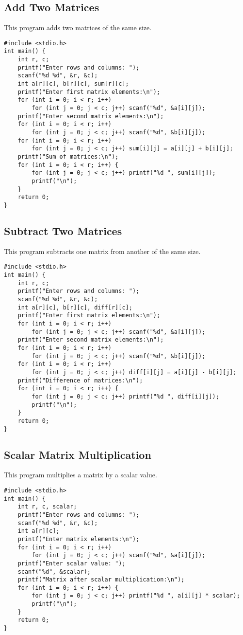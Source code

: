\documentclass[a4paper,12pt]{article}
\begin{document}
\subsection{Add Two Matrices}
This program adds two matrices of the same size.
\begin{lstlisting}[caption={Add Two Matrices}]
#include <stdio.h>
int main() {
    int r, c;
    printf("Enter rows and columns: ");
    scanf("%d %d", &r, &c);
    int a[r][c], b[r][c], sum[r][c];
    printf("Enter first matrix elements:\n");
    for (int i = 0; i < r; i++)
        for (int j = 0; j < c; j++) scanf("%d", &a[i][j]);
    printf("Enter second matrix elements:\n");
    for (int i = 0; i < r; i++)
        for (int j = 0; j < c; j++) scanf("%d", &b[i][j]);
    for (int i = 0; i < r; i++)
        for (int j = 0; j < c; j++) sum[i][j] = a[i][j] + b[i][j];
    printf("Sum of matrices:\n");
    for (int i = 0; i < r; i++) {
        for (int j = 0; j < c; j++) printf("%d ", sum[i][j]);
        printf("\n");
    }
    return 0;
}
\end{lstlisting}
\clearpage

\subsection{Subtract Two Matrices}
This program subtracts one matrix from another of the same size.
\begin{lstlisting}[caption={Subtract Two Matrices}]
#include <stdio.h>
int main() {
    int r, c;
    printf("Enter rows and columns: ");
    scanf("%d %d", &r, &c);
    int a[r][c], b[r][c], diff[r][c];
    printf("Enter first matrix elements:\n");
    for (int i = 0; i < r; i++)
        for (int j = 0; j < c; j++) scanf("%d", &a[i][j]);
    printf("Enter second matrix elements:\n");
    for (int i = 0; i < r; i++)
        for (int j = 0; j < c; j++) scanf("%d", &b[i][j]);
    for (int i = 0; i < r; i++)
        for (int j = 0; j < c; j++) diff[i][j] = a[i][j] - b[i][j];
    printf("Difference of matrices:\n");
    for (int i = 0; i < r; i++) {
        for (int j = 0; j < c; j++) printf("%d ", diff[i][j]);
        printf("\n");
    }
    return 0;
}
\end{lstlisting}
\clearpage

\subsection{Scalar Matrix Multiplication}
This program multiplies a matrix by a scalar value.
\begin{lstlisting}[caption={Scalar Matrix Multiplication}]
#include <stdio.h>
int main() {
    int r, c, scalar;
    printf("Enter rows and columns: ");
    scanf("%d %d", &r, &c);
    int a[r][c];
    printf("Enter matrix elements:\n");
    for (int i = 0; i < r; i++)
        for (int j = 0; j < c; j++) scanf("%d", &a[i][j]);
    printf("Enter scalar value: ");
    scanf("%d", &scalar);
    printf("Matrix after scalar multiplication:\n");
    for (int i = 0; i < r; i++) {
        for (int j = 0; j < c; j++) printf("%d ", a[i][j] * scalar);
        printf("\n");
    }
    return 0;
}
\end{lstlisting}
\clearpage
\end{document}
